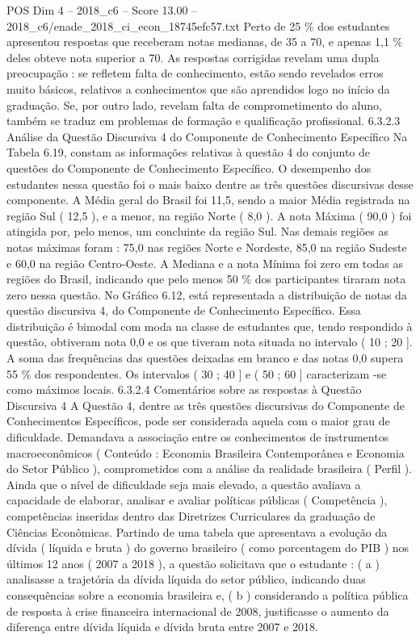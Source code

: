 \begin{textsample}{POS Dim 4 – 2018\_c6 – Score 13.00 – 2018\_c6/enade\_2018\_ci\_econ\_18745efc57.txt}
Perto de 25 \% dos estudantes apresentou respostas que receberam notas medianas, de 35 a 70, e apenas 1,1 \% deles obteve nota superior a 70.
As respostas corrigidas revelam uma dupla preocupação : se refletem falta de conhecimento, estão sendo revelados erros muito básicos, relativos a conhecimentos que são aprendidos logo no início da graduação.
Se, por outro lado, revelam falta de comprometimento do aluno, também se traduz em problemas de formação e qualificação profissional. 6.3.2.3 Análise da Questão Discursiva 4 do Componente de Conhecimento Específico Na Tabela 6.19, constam as informações relativas à questão 4 do conjunto de questões do Componente de Conhecimento Específico.
O desempenho dos estudantes nessa questão foi o mais baixo dentre as três questões discursivas desse componente.
A Média geral do Brasil foi 11,5, sendo a maior Média registrada na região Sul ( 12,5 ), e a menor, na região Norte ( 8,0 ).
A nota Máxima ( 90,0 ) foi atingida por, pelo menos, um concluinte da região Sul.
Nas demais regiões as notas máximas foram : 75,0 nas regiões Norte e Nordeste, 85,0 na região Sudeste e 60,0 na região Centro-Oeste.
A Mediana e a nota Mínima foi zero em todas as regiões do Brasil, indicando que pelo menos 50 \% dos participantes tiraram nota zero nessa questão.
No Gráfico 6.12, está representada a distribuição de notas da questão discursiva 4, do Componente de Conhecimento Específico.
Essa distribuição é bimodal com moda na classe de estudantes que, tendo respondido à questão, obtiveram nota 0,0 e os que tiveram nota situada no intervalo ( 10 ; 20 ].
A soma das frequências das questões deixadas em branco e das notas 0,0 supera 55 \% dos respondentes.
Os intervalos ( 30 ; 40 ] e ( 50 ; 60 ] caracterizam -se como máximos locais. 6.3.2.4 Comentários sobre as respostas à Questão Discursiva 4 A Questão 4, dentre as três questões discursivas do Componente de Conhecimentos Específicos, pode ser considerada aquela com o maior grau de dificuldade.
Demandava a associação entre os conhecimentos de instrumentos macroeconômicos ( Conteúdo : Economia Brasileira Contemporânea e Economia do Setor Público ), comprometidos com a análise da realidade brasileira ( Perfil ).
Ainda que o nível de dificuldade seja mais elevado, a questão avaliava a capacidade de elaborar, analisar e avaliar políticas públicas ( Competência ), competências inseridas dentro das Diretrizes Curriculares da graduação de Ciências Econômicas.
Partindo de uma tabela que apresentava a evolução da dívida ( líquida e bruta ) do governo brasileiro ( como porcentagem do PIB ) nos últimos 12 anos ( 2007 a 2018 ), a questão solicitava que o estudante : ( a ) analisasse a trajetória da dívida líquida do setor público, indicando duas consequências sobre a economia brasileira e, ( b ) considerando a política pública de resposta à crise financeira internacional de 2008, justificasse o aumento da diferença entre dívida líquida e dívida bruta entre 2007 e 2018.

\end{textsample}
